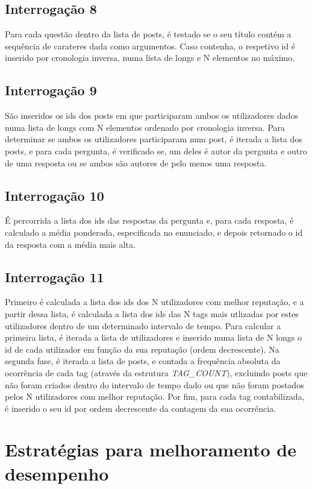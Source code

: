 \documentclass[10pt]{report}
\begin{document}
\subsection{Interrogação 8}
Para cada questão dentro da lista de posts, é testado se o seu título contém a sequência de carateres dada como argumentos. Caso contenha, o respetivo id é inserido por cronologia inversa, numa lista de longs e N elementos no máximo.

\subsection{Interrogação 9}
São inseridos os ids dos posts em que participaram ambos os utilizadores dados numa lista de longs com N elementos ordenado por cronologia inversa. Para determinar se ambos os utilizadores participaram num post, é iterada a lista dos posts, e para cada pergunta, é verificado se, um deles é autor da pergunta e outro de uma resposta ou se ambos são autores de pelo menos uma resposta.

\subsection{Interrogação 10}
É percorrida a lista dos ids das respostas da pergunta e, para cada resposta, é calculado a média ponderada, especificada no enunciado, e depois retornado o id da resposta com a média mais alta.

\subsection{Interrogação 11}
Primeiro é calculada a lista dos ids dos N utilizadores com melhor reputação, e a partir dessa lista, é calculada a lista dos ids das N tags mais utlizadas por estes utilizadores dentro de um determinado intervalo de tempo. Para calcular a primeira lista, é iterada a lista de utilizadores e inserido numa lista de N longs o id de cada utilizador em função da sua reputação (ordem decrescente). Na segunda fase, é iterada a lista de posts, e contada a frequência absoluta da ocorrência de cada tag (através da estrutura \textit{TAG\_COUNT}), excluindo posts que não foram criados dentro do intervalo de tempo dado ou que não foram postados pelos N utilizadores com melhor reputação. Por fim, para cada tag contabilizada, é inserido o seu id por ordem decrescente da contagem da sua ocorrência.

\section{Estratégias para melhoramento de desempenho}
\end{document}
